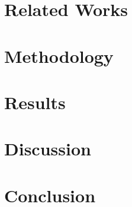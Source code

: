 \documentclass[conference, draftclsnofoot, draft]{IEEEtran}
\begin{document}
\section{Related Works}
\label{sec:related_works}

\section{Methodology}
\label{sec:methodology}

\section{Results}
\label{sec:results}

\section{Discussion}
\label{sec:discussion}

\section{Conclusion}
\label{sec:conclusion}




\end{document}
